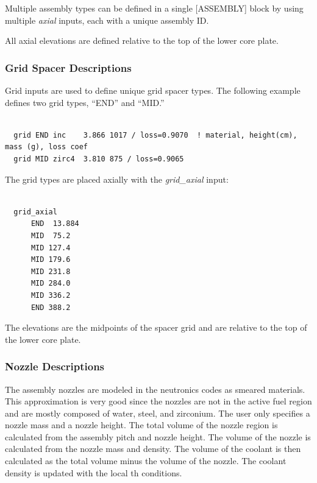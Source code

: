 Multiple assembly types can be defined in a single [ASSEMBLY] block by using
multiple {\it axial} inputs, each with a unique assembly ID.

All axial elevations are defined relative to the top of the lower core plate.

\subsubsection{Grid Spacer Descriptions}

Grid inputs are used to define unique grid spacer types.
The following example defines two grid types, ``END'' and ``MID.''
\begin{Verbatim}[fontsize=\small]

  grid END inc    3.866 1017 / loss=0.9070  ! material, height(cm), mass (g), loss coef
  grid MID zirc4  3.810 875 / loss=0.9065

\end{Verbatim}

The grid types are placed axially with the {\it grid\_axial} input:
\begin{Verbatim}[fontsize=\small]

  grid_axial
      END  13.884
      MID  75.2
      MID 127.4
      MID 179.6
      MID 231.8
      MID 284.0
      MID 336.2
      END 388.2

\end{Verbatim}

The elevations are the midpoints of the spacer grid and are relative to the top of the lower core plate.

\subsubsection{Nozzle Descriptions}

The assembly nozzles are modeled in the neutronics codes as smeared materials. This approximation is
very good since the nozzles are not in the active fuel region and are mostly
composed of water, steel, and zirconium. The user only specifies a nozzle mass and a nozzle height.
The total volume of the nozzle region is calculated from the assembly pitch and nozzle height.
The volume of the nozzle is calculated from the nozzle mass and density.
The volume of the coolant is then calculated as the total volume minus the volume of the nozzle.
The coolant density is updated with the local \ac{th} conditions.

